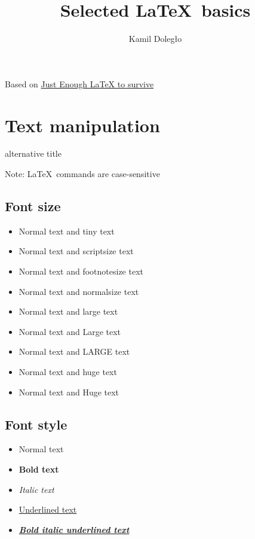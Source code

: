 \documentclass[a4paper]{article}
\title {Selected \LaTeX\ basics}
\author{Kamil Doległo}
\begin{document}
\maketitle

\tableofcontents
\vspace*{\fill}

{\footnotesize Based on \href{https://www.youtube.com/watch?v=KpDdBsxpAw4&list=PLQTQDG8nyMPjlHdquBvv6f745YSY2Jylb}{Just Enough LaTeX to survive}}

\newpage

\section{Text manipulation}{alternative title}

Note: \LaTeX\ commands are case-sensitive

\subsection{Font size}

\begin{itemize}
    \item Normal text and {\tiny tiny text}
    \item Normal text and {\scriptsize scriptsize text}
    \item Normal text and {\footnotesize footnotesize text}
    \item Normal text and {\normalsize normalsize text}
    \item Normal text and {\large large text}
    \item Normal text and {\Large Large text}
    \item Normal text and {\LARGE LARGE text}
    \item Normal text and {\huge huge text}
    \item Normal text and {\Huge Huge text}
\end{itemize}

\subsection{Font style}

\begin{itemize}
    \item Normal text
    \item \textbf{Bold text}
    \item \textit{Italic text}
    \item \underline{Underlined text}
    \item \textbf{\textit{\underline{Bold italic underlined text}}}
\end{itemize}
\end{document}
